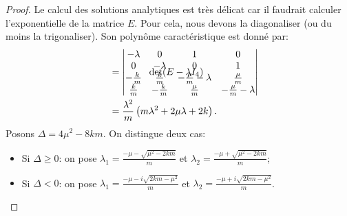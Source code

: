 \begin{proof}

Le calcul des solutions analytiques est très délicat car il faudrait calculer l'exponentielle de la matrice $E$. Pour cela, nous devons la diagonaliser (ou du moins la trigonaliser). Son polynôme caractéristique est donné par:
\begin{align*}    
\text{det}(E-\lambda I_4) \hspace{-3.8cm} &&&= \begin{vmatrix}
    -\lambda & 0 & 1 & 0 \\ 0 & -\lambda & 0& 1 \\ -\frac{k}{m} & \frac{k}{m} & -\frac{\mu}{m}-\lambda & \frac{\mu}{m} \\ \frac{k}{m} & -\frac{k}{m} & \frac{\mu}{m} & -\frac{\mu}{m} -\lambda
\end{vmatrix} \\
    &&&= \frac{\lambda^2}{m} \left( m\lambda^2 + 2\mu\lambda + 2k \right).
\end{align*}
Posons $\Delta = 4\mu^2 - 8km$. On distingue deux cas:
\begin{itemize}
    \item Si $\Delta \geq 0$: on pose $\lambda_1 = \frac{-\mu - \sqrt{\mu^2 - 2km}}{m}$ et $\lambda_2 = \frac{-\mu + \sqrt{\mu^2 - 2km}}{m}$;
    \item Si $\Delta < 0$: on pose $\lambda_1 = \frac{-\mu - i\sqrt{2km - \mu^2}}{m}$ et $\lambda_2 = \frac{-\mu + i\sqrt{2km - \mu^2}}{m}$.
\end{itemize}


\end{proof}
